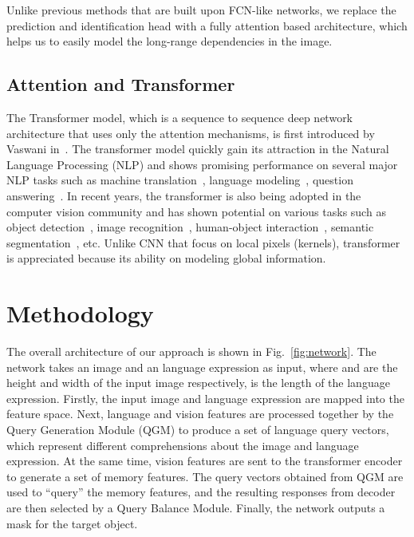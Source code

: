\documentclass[10pt,twocolumn,letterpaper]{article}
\begin{document}
Unlike previous methods that are built upon FCN-like networks, we replace the prediction and identification head with a fully attention based architecture, which helps us to easily model the long-range dependencies in the image.

\subsection{Attention and Transformer}

The Transformer model, which is a sequence to sequence deep network architecture that uses only the attention mechanisms, is first introduced by Vaswani \etal in~\cite{vaswani2017attention}. The transformer model quickly gain its attraction in the Natural Language Processing (NLP) and shows promising performance on several major NLP tasks such as machine translation~\cite{vaswani2017attention}, language modeling~\cite{krause2019dynamic}, question answering~\cite{devlin2018bert}. In recent years, the transformer is also being adopted in the computer vision community and has shown potential on various tasks such as object detection~\cite{carion2020end}, image recognition~\cite{dosovitskiy2020image}, human-object interaction~\cite{wangsuchen_iccv2021}, semantic segmentation~\cite{zheng2020rethinking}, etc. Unlike CNN that focus on local pixels (kernels), transformer is appreciated because its ability on modeling global information.




\section{Methodology}

The overall architecture of our approach is shown in Fig.~\ref{fig:network}.  The network takes an image  and an language expression  as input, where  and  are the height and width of the input image respectively,  is the length of the language expression. Firstly, the input image and language expression are mapped into the feature space. Next, language and vision features are processed together by the Query Generation Module (QGM) to produce a set of language query vectors, which represent different comprehensions about the image and language expression. At the same time, vision features are sent to the transformer encoder to generate a set of memory features. The query vectors obtained from QGM are used to ``query'' the memory features, and the resulting responses from decoder are then selected by a Query Balance Module. Finally, the network outputs a mask  for the target object.
\end{document}
